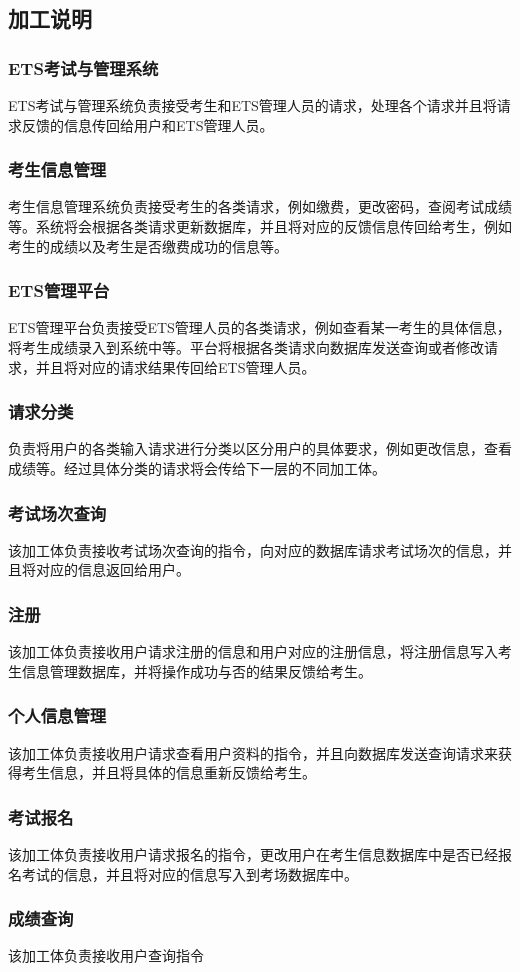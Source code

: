 \subsection{加工说明}
\subsubsection{ETS考试与管理系统}
ETS考试与管理系统负责接受考生和ETS管理人员的请求，处理各个请求并且将请求反馈的信息传回给用户和ETS管理人员。

\subsubsection{考生信息管理}
考生信息管理系统负责接受考生的各类请求，例如缴费，更改密码，查阅考试成绩等。系统将会根据各类请求更新数据库，并且将对应的反馈信息传回给考生，例如考生的成绩以及考生是否缴费成功的信息等。

\subsubsection{ETS管理平台}
ETS管理平台负责接受ETS管理人员的各类请求，例如查看某一考生的具体信息，将考生成绩录入到系统中等。平台将根据各类请求向数据库发送查询或者修改请求，并且将对应的请求结果传回给ETS管理人员。

\subsubsection{请求分类}
负责将用户的各类输入请求进行分类以区分用户的具体要求，例如更改信息，查看成绩等。经过具体分类的请求将会传给下一层的不同加工体。

\subsubsection{考试场次查询}
该加工体负责接收考试场次查询的指令，向对应的数据库请求考试场次的信息，并且将对应的信息返回给用户。

\subsubsection{注册}
该加工体负责接收用户请求注册的信息和用户对应的注册信息，将注册信息写入考生信息管理数据库，并将操作成功与否的结果反馈给考生。

\subsubsection{个人信息管理}
该加工体负责接收用户请求查看用户资料的指令，并且向数据库发送查询请求来获得考生信息，并且将具体的信息重新反馈给考生。

\subsubsection{考试报名}
该加工体负责接收用户请求报名的指令，更改用户在考生信息数据库中是否已经报名考试的信息，并且将对应的信息写入到考场数据库中。

\subsubsection{成绩查询}
该加工体负责接收用户查询指令

